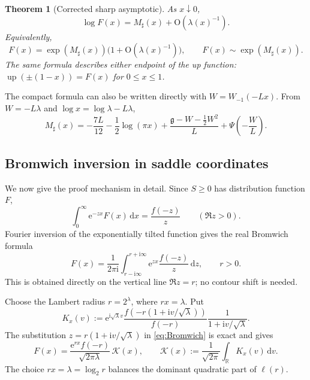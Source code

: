 \documentclass[11pt]{article}
\numberwithin{equation}{section}
\newtheorem{theorem}{Theorem}[section]
\theoremstyle{definition}
\theoremstyle{remark}
\newcommand{\R}{\mathbb R}
\newcommand{\upf}{\operatorname{up}}
\newcommand{\dd}{\,\mathrm d}
\newcommand{\e}{\mathrm e}
\newcommand{\ii}{\mathrm i}
\newcommand{\Oh}{\mathrm O}
\begin{document}
\begin{theorem}[Corrected sharp asymptotic]\label{thm:sharp-asymptotic}
As $x\downarrow0$,
\begin{equation}\label{eq:sharp-asymptotic}
 \boxed{\log F(x)=M_\sharp(x)+\Oh(\lambda(x)^{-1}).}
\end{equation}
Equivalently,
\begin{equation}\label{eq:sharp-F-equivalent}
 F(x)=\exp(M_\sharp(x))\bigl(1+\Oh(\lambda(x)^{-1})\bigr),
 \qquad
 F(x)\sim\exp(M_\sharp(x)).
\end{equation}
The same formula describes either endpoint of the up function:
$\upf(\pm(1-x))=F(x)$ for $0\le x\le1$.
\end{theorem}

The compact formula can also be written directly with
$W=W_{-1}(-Lx)$.  From $W=-L\lambda$ and
$\log x=\log\lambda-L\lambda$,
\begin{equation}\label{eq:Msharp-W}
 M_\sharp(x)=
 -\frac{7L}{12}-\frac12\log(\pi x)
 +\frac{\mathfrak g-W-\tfrac12W^2}{L}
 +\Psi\!\left(-\frac WL\right).
\end{equation}

\subsection{Bromwich inversion in saddle coordinates}

We now give the proof mechanism in detail.  Since $S\ge0$ has distribution
function $F$,
\begin{equation}\label{eq:Laplace-CDF}
 \int_0^\infty \e^{-zx}F(x)\dd x=\frac{f(-z)}{z}
 \qquad(\Re z>0).
\end{equation}
Fourier inversion of the exponentially tilted function gives the real
Bromwich formula
\begin{equation}\label{eq:Bromwich}
 F(x)=\frac{1}{2\pi\ii}
 \int_{r-\ii\infty}^{r+\ii\infty}
   \e^{zx}\frac{f(-z)}{z}\dd z,
 \qquad r>0.
\end{equation}
This is obtained directly on the vertical line $\Re z=r$; no contour shift is
needed.

Choose the Lambert radius $r=2^\lambda$, where $rx=\lambda$.  Put
\begin{equation}\label{eq:scaled-kernel}
 K_{x}(v):=
 \e^{\ii\sqrt\lambda v}
 \frac{f\!\left(-r(1+\ii v/\sqrt\lambda)\right)}{f(-r)}
 \frac{1}{1+\ii v/\sqrt\lambda}.
\end{equation}
The substitution $z=r(1+\ii v/\sqrt\lambda)$ in
\eqref{eq:Bromwich} is exact and gives
\begin{equation}\label{eq:exact-saddle-factorization}
\boxed{
 F(x)=\frac{\e^{rx}f(-r)}{\sqrt{2\pi\lambda}}\,
 \mathcal K(x),
 \qquad
 \mathcal K(x):=\frac1{\sqrt{2\pi}}
   \int_{\R}K_x(v)\dd v.}
\end{equation}
The choice $rx=\lambda=\log_2r$ balances the dominant quadratic part of
$\ell(r)$.
\end{document}
